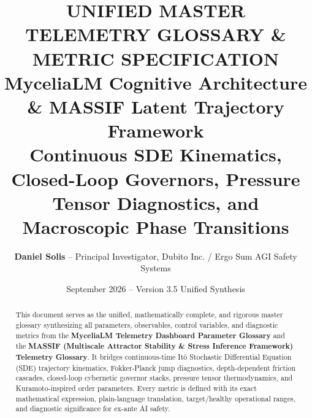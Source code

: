 \documentclass[10pt,a4paper]{article}
\title{\vspace{-1.5cm}\Large \textbf{UNIFIED MASTER TELEMETRY GLOSSARY \& METRIC SPECIFICATION}\\
\large \textcolor{docblue}{MyceliaLM Cognitive Architecture \& MASSIF Latent Trajectory Framework}\\
\small \textsf{Continuous SDE Kinematics, Closed-Loop Governors, Pressure Tensor Diagnostics, and Macroscopic Phase Transitions}}
\author{\textbf{Daniel Solis} -- Principal Investigator, Dubito Inc. / Ergo Sum AGI Safety Systems}
\date{September 2026 -- Version 3.5 Unified Synthesis}
\begin{document}
\maketitle

\begin{abstract}
\noindent This document serves as the unified, mathematically complete, and rigorous master glossary synthesizing all parameters, observables, control variables, and diagnostic metrics from the \textbf{MyceliaLM Telemetry Dashboard Parameter Glossary} and the \textbf{MASSIF (Multiscale Attractor Stability \& Stress Inference Framework) Telemetry Glossary}. It bridges continuous-time It\^o Stochastic Differential Equation (SDE) trajectory kinematics, Fokker-Planck jump diagnostics, depth-dependent friction cascades, closed-loop cybernetic governor stacks, pressure tensor thermodynamics, and Kuramoto-inspired order parameters. Every metric is defined with its exact mathematical expression, plain-language translation, target/healthy operational ranges, and diagnostic significance for ex-ante AI safety.
\end{abstract}

\tableofcontents
\newpage

\end{document}
